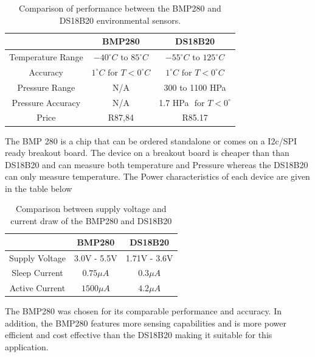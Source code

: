 \begin{table}[H]
    \centering
    \caption{Comparison of performance between the BMP280 and DS18B20 environmental sensors.}
    \begin{tabular}{|c|c|c|}
    \hline
         & \textbf{BMP280} & \textbf{DS18B20} \\
         \hline
         Temperature Range & $-40^\circ C \text{ to } 85^\circ C$&$-55^\circ C \text{ to } 125^\circ C$ \\
         \hline
         Accuracy & $1^\circ C \text{ for } T < 0^\circ C$ & $1^\circ C \text{ for } T < 0^\circ C$ \\
         \hline
         Pressure Range  & N/A & 300 to 1100 HPa \\
         \hline
         Pressure Accuracy & N/A & 1.7 HPa $ \text{ for } T < 0^\circ $\\
         \hline
         Price & R87,84 & R85.17 \\
         \hline
    \end{tabular}
    \label{tab:senv_spec}
\end{table}

The BMP 280 is a chip that can be ordered standalone or comes on a I2c/SPI ready breakout board. The device on a breakout board is cheaper than than DS18B20 and can measure both temperature and Pressure whereas the DS18B20 can only measure temperature. The Power characteristics of each device are given in the table below

\begin{table}[H]
    \centering
    \caption{Comparison between supply voltage and current draw of the BMP280 and DS18B20}
    \begin{tabular}{|c|c|c|}
        \hline
         &  \textbf{BMP280} & \textbf{DS18B20}\\
         \hline
         Supply Voltage & 3.0V - 5.5V & 1.71V - 3.6V\\
        Sleep Current & $0.75\mu A$ & $0.3\mu A$\\ 
        Active Current & $1500\mu A $ & $4.2\mu A$\\
        \hline
    \end{tabular}

    \label{tab:env_power}
\end{table}

The BMP280 was chosen for its comparable performance and accuracy. In addition, the BMP280 features more sensing capabilities and is more power efficient and cost effective than the DS18B20 making it suitable for this application.\par 

